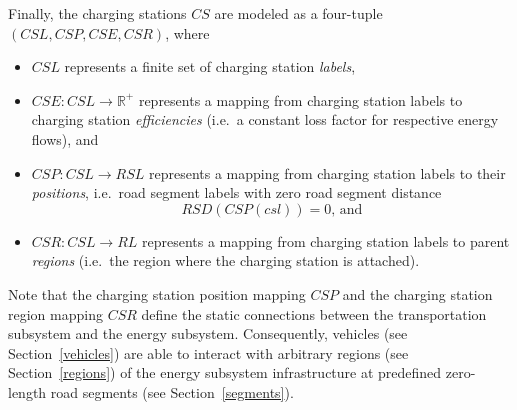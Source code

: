 Finally, the charging stations $CS$ are modeled as a four-tuple $(CSL, CSP, CSE, CSR)$, where
\begin{itemize}
	\item $CSL$ represents a finite set of charging station \textit{labels},
	\item $CSE: CSL \rightarrow \mathbb{R}^+$ represents a mapping from charging station labels to charging station \textit{efficiencies} (i.e.\ a constant loss factor for respective energy flows), and
	\item $CSP: CSL \rightarrow RSL$ represents a mapping from charging station labels to their \textit{positions}, i.e.\ road segment labels with zero road segment distance
	\[
		RSD(CSP(csl)) = 0 \textrm{, and}
	\]
	\item $CSR: CSL \rightarrow RL$ represents a mapping from charging station labels to parent \textit{regions} (i.e.\ the region where the charging station is attached).
\end{itemize}
Note that the charging station position mapping $CSP$  and the charging station region mapping $CSR$ define the static connections between the transportation subsystem and the energy subsystem. Consequently, vehicles (see Section~\ref{vehicles}) are able to interact with arbitrary regions (see Section~\ref{regions}) of the energy subsystem infrastructure at predefined zero-length road segments (see Section~\ref{segments}).
